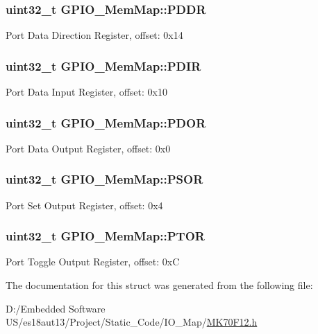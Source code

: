 \subsubsection[{P\+D\+D\+R}]{\setlength{\rightskip}{0pt plus 5cm}uint32\+\_\+t G\+P\+I\+O\+\_\+\+Mem\+Map\+::\+P\+D\+D\+R}\label{struct_g_p_i_o___mem_map_a49dfaa95d08fa9178dd7f098c87f562d}
Port Data Direction Register, offset\+: 0x14 \hypertarget{struct_g_p_i_o___mem_map_a01933bea5d005bf126ea2e0345518763}{}
\subsubsection[{P\+D\+I\+R}]{\setlength{\rightskip}{0pt plus 5cm}uint32\+\_\+t G\+P\+I\+O\+\_\+\+Mem\+Map\+::\+P\+D\+I\+R}\label{struct_g_p_i_o___mem_map_a01933bea5d005bf126ea2e0345518763}
Port Data Input Register, offset\+: 0x10 \hypertarget{struct_g_p_i_o___mem_map_aaf4f486952b9b4680e270ce6266122fd}{}
\subsubsection[{P\+D\+O\+R}]{\setlength{\rightskip}{0pt plus 5cm}uint32\+\_\+t G\+P\+I\+O\+\_\+\+Mem\+Map\+::\+P\+D\+O\+R}\label{struct_g_p_i_o___mem_map_aaf4f486952b9b4680e270ce6266122fd}
Port Data Output Register, offset\+: 0x0 \hypertarget{struct_g_p_i_o___mem_map_a14833f065ec123137ccce5ab873b5879}{}
\subsubsection[{P\+S\+O\+R}]{\setlength{\rightskip}{0pt plus 5cm}uint32\+\_\+t G\+P\+I\+O\+\_\+\+Mem\+Map\+::\+P\+S\+O\+R}\label{struct_g_p_i_o___mem_map_a14833f065ec123137ccce5ab873b5879}
Port Set Output Register, offset\+: 0x4 \hypertarget{struct_g_p_i_o___mem_map_a03faa882b5f4554ff4c11954c2d8759b}{}
\subsubsection[{P\+T\+O\+R}]{\setlength{\rightskip}{0pt plus 5cm}uint32\+\_\+t G\+P\+I\+O\+\_\+\+Mem\+Map\+::\+P\+T\+O\+R}\label{struct_g_p_i_o___mem_map_a03faa882b5f4554ff4c11954c2d8759b}
Port Toggle Output Register, offset\+: 0x\+C 

The documentation for this struct was generated from the following file\+:\begin{DoxyCompactItemize}
\item 
D\+:/\+Embedded Software U\+S/es18aut13/\+Project/\+Static\+\_\+\+Code/\+I\+O\+\_\+\+Map/\hyperlink{_m_k70_f12_8h}{M\+K70\+F12.\+h}\end{DoxyCompactItemize}
